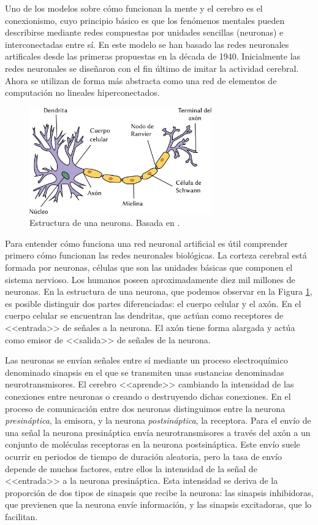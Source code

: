 \documentclass[
  a4paper,
  12pt,
  spanish,
]{scrartcl}
\theoremstyle{teorema-style}
\begin{document}
Uno de los modelos sobre cómo funcionan la mente y el cerebro es el conexionismo, cuyo principio básico es que los fenómenos mentales pueden describirse mediante redes compuestas por unidades sencillas (neuronas) e interconectadas entre sí.
En este modelo se han basado las redes neuronales artificales desde las primeras propuestas en la década de 1940.
Inicialmente las redes neuronales se diseñaron con el fin último de imitar la actividad cerebral.
Ahora se utilizan de forma más abstracta como una red de elementos de computación no lineales hiperconectados.

\begin{figure}[b]
  \centering
  \includegraphics[width=0.7\textwidth]{img/neurona}
  \caption{Estructura de una neurona. Basada en \parencite{dhp1080_neurona_2007}.}
  \label{fig:neurona}
\end{figure}

Para entender cómo funciona una red neuronal artificial es útil comprender primero cómo funcionan las redes neuronales biológicas.
La corteza cerebral está formada por neuronas, células que son las unidades básicas que componen el sistema nervioso.
Los humanos poseen aproximadamente diez mil millones de neuronas.
En la estructura de una neurona, que podemos observar en la Figura \ref{fig:neurona}, es posible distinguir dos partes diferenciadas: el cuerpo celular y el axón.
En el cuerpo celular se encuentran las dendritas, que actúan como receptores de <<entrada>> de señales a la neurona.
El axón tiene forma alargada y actúa como emisor de <<salida>> de señales de la neurona.

Las neuronas se envían señales entre sí mediante un proceso electroquímico denominado sinapsis en el que se transmiten unas sustancias denominadas neurotransmisores.
El cerebro <<aprende>> cambiando la intensidad de las conexiones entre neuronas o creando o destruyendo dichas conexiones.
En el proceso de comunicación entre dos neuronas distinguimos entre la neurona \textit{presináptica}, la emisora, y la neurona \textit{postsináptica}, la receptora.
Para el envío de una señal la neurona presináptica envía neurotransmisores a través del axón a un conjunto de moléculas receptoras en la neurona postsináptica.
Este envío suele ocurrir en periodos de tiempo de duración aleatoria, pero la tasa de envío depende de muchos factores, entre ellos la intensidad de la señal de <<entrada>> a la neurona presináptica.
Esta intensidad se deriva de la proporción de dos tipos de sinapsis que recibe la neurona: las sinapsis inhibidoras, que previenen que la neurona envíe información, y las sinapsis excitadoras, que lo facilitan.
\end{document}
